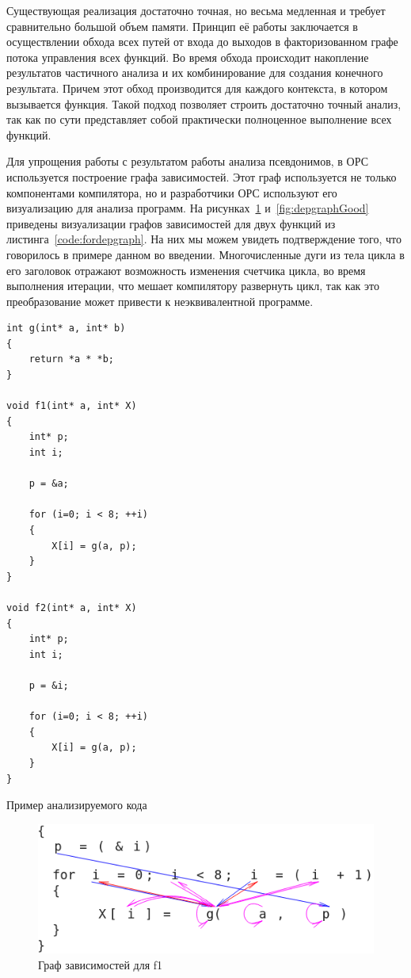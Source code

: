 Существующая реализация достаточно точная, но весьма медленная и требует сравнительно большой объем памяти. Принцип её работы заключается в осуществлении обхода всех путей от входа до выходов в факторизованном графе потока управления всех функций. Во время обхода происходит накопление результатов частичного анализа и их комбинирование для создания конечного результата. Причем этот обход производится для каждого контекста, в котором вызывается функция. Такой подход позволяет строить достаточно точный анализ, так как по сути представляет собой практически полноценное выполнение всех функций.

Для упрощения работы с результатом работы анализа псевдонимов, в ОРС используется построение графа зависимостей. Этот граф используется не только компонентами компилятора, но и разработчики ОРС используют его визуализацию для анализа программ. На рисунках~\ref{fig:depgraphBad} и~\ref{fig:depgraphGood} приведены визуализации графов зависимостей для двух функций из листинга~\ref{code:fordepgraph}. На них мы можем увидеть подтверждение того, что говорилось в примере данном во введении. Многочисленные дуги из тела цикла в его заголовок отражают возможность изменения счетчика цикла, во время выполнения итерации, что мешает компилятору развернуть цикл, так как это преобразование может привести к неэквивалентной программе.

\begin{ListingEnv}[H]
\begin{lstlisting}
int g(int* a, int* b)
{
    return *a * *b;
}

void f1(int* a, int* X)
{
    int* p;
    int i;
    
    p = &a;

    for (i=0; i < 8; ++i)
    {
        X[i] = g(a, p);
    }
}

void f2(int* a, int* X)
{
    int* p;
    int i;
    
    p = &i;

    for (i=0; i < 8; ++i)
    {
        X[i] = g(a, p);
    }
}
\end{lstlisting}
\caption{Пример анализируемого кода}
\label{code:fordepgraph}
\end{ListingEnv}

\begin{figure}[H]
\centering
\includegraphics[width=1\textwidth]{img/opsDepGraphBad_alpha.png}
\caption{Граф зависимостей для f1}
\label{fig:depgraphBad}
\end{figure}


